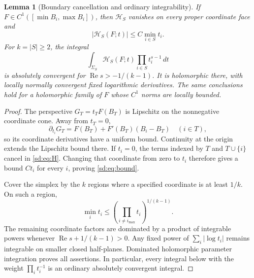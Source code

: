 \documentclass[11pt,a4paper]{article}
\numberwithin{equation}{section}
\newtheorem{lemma}[theorem]{Lemma}
\theoremstyle{definition}
\theoremstyle{remark}
\begin{document}
\begin{lemma}[Boundary cancellation and ordinary integrability]
\label{sd:lem:boundary}
If $F\in C^1([\min B_i,\max B_i])$, then $\mathcal H_S$ vanishes
on every proper coordinate face and
\begin{equation}\label{sd:eq:bound}
 |\mathcal H_S(F;t)|\le C\min_{i\in S}t_i.
\end{equation}
For $k=|S|\ge2$, the integral
\begin{equation}\label{sd:eq:integralhol}
 \int_{\Sigma_S}\mathcal H_S(F;t)
                            \prod_{i\in S}t_i^{s-1}\,dt
\end{equation}
is absolutely convergent for $\operatorname{Re}s>-1/(k-1)$.
It is holomorphic there, with locally normally convergent fixed
logarithmic derivatives.  The same conclusions hold for a holomorphic
family of $F$ whose $C^1$ norms are locally bounded.
\end{lemma}
\begin{proof}
The perspective $G_T=t_TF(B_T)$ is Lipschitz on the nonnegative
coordinate cone.  Away from $t_T=0$,
\[
 \partial_{t_i}G_T=F(B_T)+F'(B_T)(B_i-B_T)\quad(i\in T),
\]
so its coordinate derivatives have a uniform bound.  Continuity at the
origin extends the Lipschitz bound there.  If $t_i=0$, the terms indexed
by $T$ and $T\cup\{i\}$ cancel in \eqref{sd:eq:H}.  Changing that
coordinate from zero to $t_i$ therefore gives a bound $Ct_i$ for
every $i$, proving \eqref{sd:eq:bound}.

Cover the simplex by the $k$ regions where a specified coordinate is
at least $1/k$.  On such a region,
\[
 \min_i t_i\le
        \left(\prod_{i\ne i_{\max}}t_i\right)^{1/(k-1)}.
\]
The remaining coordinate factors are dominated by a product of
integrable powers whenever $\operatorname{Re}s+1/(k-1)>0$.
Any fixed power of $\sum_i|\log t_i|$ remains integrable on smaller
closed half-planes.  Dominated holomorphic parameter integration proves
all assertions.  In particular, every integral below with the weight
$\prod_i t_i^{-1}$ is an ordinary absolutely convergent integral.
\end{proof}
\end{document}
